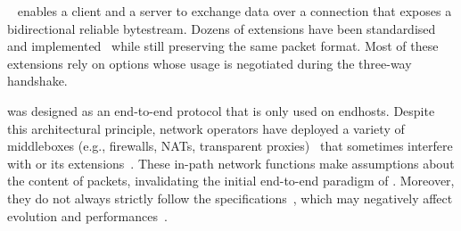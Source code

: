 
\tcp~\cite{rfc793} enables a client and a server to exchange data
over a connection that exposes a bidirectional reliable bytestream.
Dozens of \tcp extensions have been standardised and implemented~\cite{RFC7414} while still preserving the same packet format. Most of these extensions rely on \tcp options whose usage is negotiated during the three-way handshake.





\tcp was designed as an end-to-end protocol that is only used on endhosts.
Despite this architectural principle, network operators have deployed a variety
of middleboxes (e.g., firewalls, NATs, transparent proxies)~\cite{mCloud} that
sometimes interfere with \tcp or its extensions~\cite{medina2004measuring,
honda2011still, edeline2019bottom}. These in-path network functions make
assumptions about the content of \tcp packets, invalidating the initial
end-to-end paradigm of \tcp. Moreover, they do not always strictly follow the
\tcp specifications~\cite{honda2011still, hesmans2013tcp}, which may negatively
affect \tcp evolution and performances~\cite{edeline2020evaluating}.





